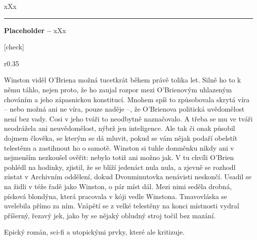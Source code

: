 \documentclass{extarticle} %
\begin{document}
\noindent 
xXx

\vfill

\noindent\begin{minipage}{\textwidth}
    {\textcolor{\wpagecolor}{\rule{\linewidth}{0.4pt}}
    \footnotesize
    \textbf{Placeholder --} xXx
    }
\end{minipage}

\newpage


\changefontsize{7pt}

[check]

\noindent\begin{wrapfigure}{r}{0.35\textwidth}
\tiny

\setlength{\parindent}{3pt}\setlength{\parskip}{0.5em}
Winston viděl O’Briena možná tucetkrát během právě tolika let.
Silně ho to k němu táhlo, nejen proto, že ho zaujal rozpor mezi O’Brienovým uhlazeným chováním
a jeho zápasnickou konstitucí.
Mnohem spíš to způsobovala skrytá víra – nebo možná ani ne víra, pouze naděje –,
že O’Brienova politická uvědomělost není bez vady.
Cosi v jeho tváři to neodbytně naznačovalo.
A třeba se mu ve tváři neodrážela ani neuvědomělost, nýbrž jen inteligence.
Ale tak či onak působil dojmem člověka, se kterým se dá mluvit,
pokud se vám nějak podaří obelstít telestěnu a zastihnout ho o samotě.
Winston si tuhle domněnku nikdy ani v nejmenším nezkoušel ověřit: nebylo totiž ani možno jak.
V tu chvíli O’Brien pohlédl na hodinky, zjistil, že se blíží jedenáct nula nula,
a zjevně se rozhodl zůstat v Archivním oddělení, dokud Dvouminutovka nenávisti neskončí.
Usadil se na židli v téže řadě jako Winston, o pár míst dál.
Mezi nimi seděla drobná, písková blondýna, která pracovala v kóji vedle Winstona.
Tmavovláska se uvelebila přímo za ním.
Vzápětí se z velké telestěny na konci místnosti vydral příšerný, řezavý jek,
jako by se nějaký obludný stroj točil bez mazání.
\end{wrapfigure}


\noindent 
Epický román, sci-fi a utopickými prvky, které ale kritizuje.



\end{document}
